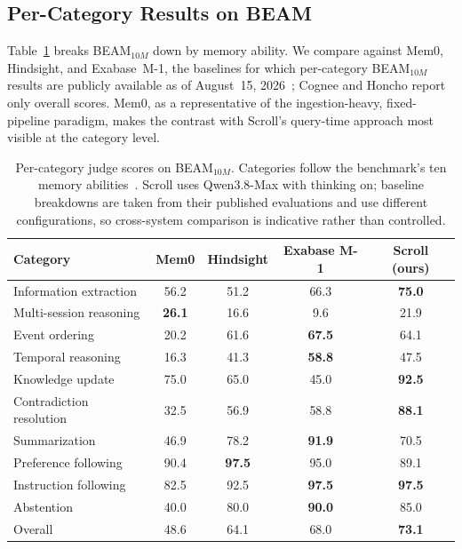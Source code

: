 \subsection{Per-Category Results on BEAM}
\label{app:beam-category}
Table~\ref{tab:beam-category} breaks BEAM$_{10M}$ down by memory ability. We compare against Mem0, Hindsight, and Exabase~M-1, the baselines for which per-category BEAM$_{10M}$ results are publicly available as of August~15, 2026~\citep{mem0-eval,hindsight,exabase}; Cognee and Honcho report only overall scores. Mem0, as a representative of the ingestion-heavy, fixed-pipeline paradigm, makes the contrast with Scroll's query-time approach most visible at the category level.


\begin{table}[h]
  \centering
  \caption{Per-category judge scores on BEAM$_{10M}$. Categories follow the
    benchmark's ten memory abilities~\citep{beam}. Scroll uses Qwen3.8-Max with
    thinking on; baseline breakdowns are taken from their published evaluations and
    use different configurations, so cross-system comparison is indicative rather than
    controlled.}
  \label{tab:beam-category}
  \small
  \setlength{\tabcolsep}{4pt}
  \begin{tabular}{lcccc}
    \toprule
    Category                 & Mem0          & Hindsight     & Exabase M-1   & Scroll (ours) \\
    \midrule
    Information extraction   & 56.2          & 51.2          & 66.3          & \textbf{75.0} \\
    Multi-session reasoning  & \textbf{26.1} & 16.6          & 9.6           & 21.9          \\
    Event ordering           & 20.2          & 61.6          & \textbf{67.5} & 64.1          \\
    Temporal reasoning       & 16.3          & 41.3          & \textbf{58.8} & 47.5          \\
    Knowledge update         & 75.0          & 65.0          & 45.0          & \textbf{92.5} \\
    Contradiction resolution & 32.5          & 56.9          & 58.8          & \textbf{88.1} \\
    Summarization            & 46.9          & 78.2          & \textbf{91.9} & 70.5          \\
    Preference following     & 90.4          & \textbf{97.5} & 95.0          & 89.1          \\
    Instruction following    & 82.5          & 92.5          & \textbf{97.5} & \textbf{97.5} \\
    Abstention               & 40.0          & 80.0          & \textbf{90.0} & 85.0          \\
    \midrule
    Overall                  & 48.6          & 64.1          & 68.0          & \textbf{73.1} \\
    \bottomrule
  \end{tabular}
\end{table}


